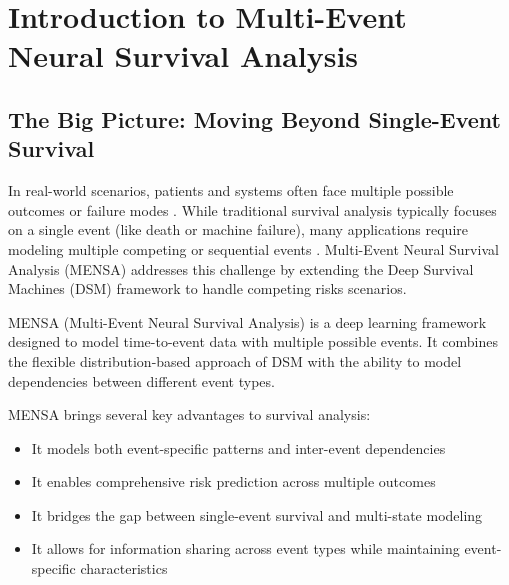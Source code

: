 \section{Introduction to Multi-Event Neural Survival Analysis}

\subsection{The Big Picture: Moving Beyond Single-Event Survival}

In real-world scenarios, patients and systems often face multiple possible outcomes or failure modes \parencite{fine1999,prentice1978}. While traditional survival analysis typically focuses on a single event (like death or machine failure), many applications require modeling multiple competing or sequential events \parencite{austin2016,koller2012}. Multi-Event Neural Survival Analysis (MENSA) \parencite{zhong2021} addresses this challenge by extending the Deep Survival Machines (DSM) framework to handle competing risks scenarios.

\begin{notebox}[title=What is MENSA?]
MENSA (Multi-Event Neural Survival Analysis) is a deep learning framework designed to model time-to-event data with multiple possible events. It combines the flexible distribution-based approach of DSM with the ability to model dependencies between different event types.
\end{notebox}

MENSA brings several key advantages to survival analysis:

\begin{itemize}
    \item It models both event-specific patterns and inter-event dependencies
    \item It enables comprehensive risk prediction across multiple outcomes
    \item It bridges the gap between single-event survival and multi-state modeling
    \item It allows for information sharing across event types while maintaining event-specific characteristics
\end{itemize}

